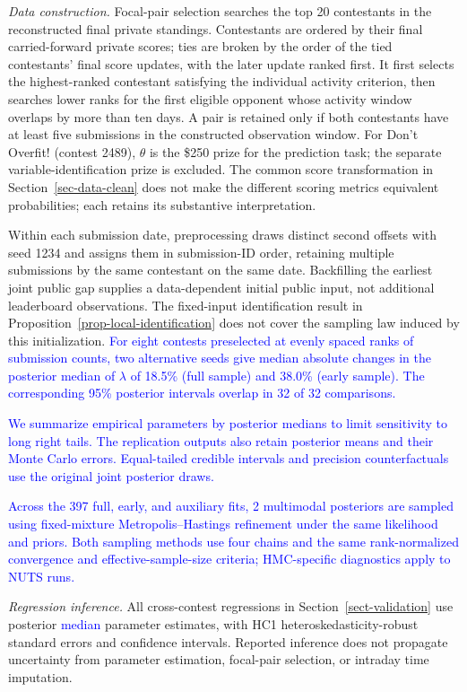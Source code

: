 \documentclass[mnsc]{informs3}
\begin{document}
\begin{APPENDICES}
{\textit{Data construction.}} Focal-pair selection searches the top 20 contestants in the reconstructed final private standings. Contestants are ordered by their final carried-forward private scores; ties are broken by the order of the tied contestants' final score updates, with the later update ranked first. It first selects the highest-ranked contestant satisfying the individual activity criterion, then searches lower ranks for the first eligible opponent whose activity window overlaps by more than ten days. A pair is retained only if both contestants have at least five submissions in the constructed observation window. For Don't Overfit! (contest 2489), $\theta$ is the \$250 prize for the prediction task; the separate variable-identification prize is excluded. The common score transformation in Section~\ref{sec-data-clean} does not make the different scoring metrics equivalent probabilities; each retains its substantive interpretation.

Within each submission date, preprocessing draws distinct second offsets with seed 1234 and assigns them in submission-ID order, retaining multiple submissions by the same contestant on the same date. Backfilling the earliest joint public gap supplies a data-dependent initial public input, not additional leaderboard observations. {The fixed-input identification result in Proposition~\ref{prop-local-identification} does not cover the sampling law induced by this initialization.} \textcolor{blue}{For eight contests preselected at evenly spaced ranks of submission counts, two alternative seeds give median absolute changes in the posterior median of $\lambda$ of 18.5\% (full sample) and 38.0\% (early sample). The corresponding 95\% posterior intervals overlap in 32 of 32 comparisons.}

\textcolor{blue}{We summarize empirical parameters by posterior medians to limit sensitivity to long right tails. The replication outputs also retain posterior means and their Monte Carlo errors. Equal-tailed credible intervals and precision counterfactuals use the original joint posterior draws.}

\textcolor{blue}{Across the 397 full, early, and auxiliary fits, 2 multimodal posteriors are sampled using fixed-mixture Metropolis--Hastings refinement under the same likelihood and priors. Both sampling methods use four chains and the same rank-normalized convergence and effective-sample-size criteria; HMC-specific diagnostics apply to NUTS runs.}

{\textit{Regression inference.}} All cross-contest regressions in Section~\ref{sect-validation} use posterior \textcolor{blue}{median} parameter estimates, {with HC1 heteroskedasticity-robust standard errors and confidence intervals. Reported inference does not propagate uncertainty from parameter estimation, focal-pair selection, or intraday time imputation.}


\end{APPENDICES}
\end{document}
